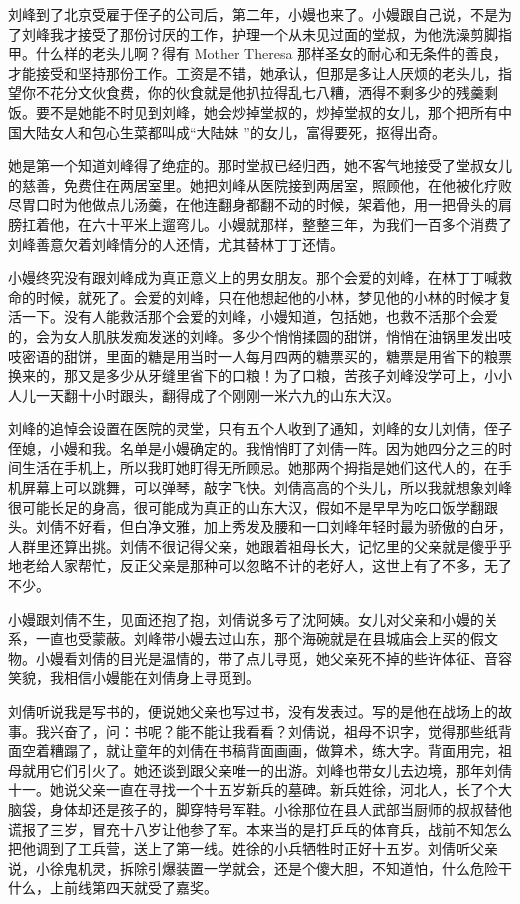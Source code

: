 \documentclass[12pt,twoside,openany]{book}
\begin{document}
刘峰到了北京受雇于侄子的公司后，第二年，小嫚也来了。小嫚跟自己说，不是为了刘峰我才接受了那份讨厌的工作，护理一个从未见过面的堂叔，为他洗澡剪脚指甲。什么样的老头儿啊？得有 Mother Theresa 那样圣女的耐心和无条件的善良，才能接受和坚持那份工作。工资是不错，她承认，但那是多让人厌烦的老头儿，指望你不花分文伙食费，你的伙食就是他扒拉得乱七八糟，洒得不剩多少的残羹剩饭。要不是她能不时见到刘峰，她会炒掉堂叔的，炒掉堂叔的女儿，那个把所有中国大陆女人和包心生菜都叫成“大陆妹 ”的女儿，富得要死，抠得出奇。

她是第一个知道刘峰得了绝症的。那时堂叔已经归西，她不客气地接受了堂叔女儿的慈善，免费住在两居室里。她把刘峰从医院接到两居室，照顾他，在他被化疗败尽胃口时为他做点儿汤羹，在他连翻身都翻不动的时候，架着他，用一把骨头的肩膀扛着他，在六十平米上遛弯儿。小嫚就那样，整整三年，为我们一百多个消费了刘峰善意欠着刘峰情分的人还情，尤其替林丁丁还情。

小嫚终究没有跟刘峰成为真正意义上的男女朋友。那个会爱的刘峰，在林丁丁喊救命的时候，就死了。会爱的刘峰，只在他想起他的小林，梦见他的小林的时候才复活一下。没有人能救活那个会爱的刘峰，小嫚知道，包括她，也救不活那个会爱的，会为女人肌肤发痴发迷的刘峰。多少个悄悄揉圆的甜饼，悄悄在油锅里发出吱吱密语的甜饼，里面的糖是用当时一人每月四两的糖票买的，糖票是用省下的粮票换来的，那又是多少从牙缝里省下的口粮！为了口粮，苦孩子刘峰没学可上，小小人儿一天翻十小时跟头，翻得成了个刚刚一米六九的山东大汉。

刘峰的追悼会设置在医院的灵堂，只有五个人收到了通知，刘峰的女儿刘倩，侄子侄媳，小嫚和我。名单是小嫚确定的。我悄悄盯了刘倩一阵。因为她四分之三的时间生活在手机上，所以我盯她盯得无所顾忌。她那两个拇指是她们这代人的，在手机屏幕上可以跳舞，可以弹琴，敲字飞快。刘倩高高的个头儿，所以我就想象刘峰很可能长足的身高，很可能成为真正的山东大汉，假如不是早早为吃口饭学翻跟头。刘倩不好看，但白净文雅，加上秀发及腰和一口刘峰年轻时最为骄傲的白牙，人群里还算出挑。刘倩不很记得父亲，她跟着祖母长大，记忆里的父亲就是傻乎乎地老给人家帮忙，反正父亲是那种可以忽略不计的老好人，这世上有了不多，无了不少。

小嫚跟刘倩不生，见面还抱了抱，刘倩说多亏了沈阿姨。女儿对父亲和小嫚的关系，一直也受蒙蔽。刘峰带小嫚去过山东，那个海碗就是在县城庙会上买的假文物。小嫚看刘倩的目光是温情的，带了点儿寻觅，她父亲死不掉的些许体征、音容笑貌，我相信小嫚能在刘倩身上寻觅到。

刘倩听说我是写书的，便说她父亲也写过书，没有发表过。写的是他在战场上的故事。我兴奋了，问：书呢？能不能让我看看？刘倩说，祖母不识字，觉得那些纸背面空着糟蹋了，就让童年的刘倩在书稿背面画画，做算术，练大字。背面用完，祖母就用它们引火了。她还谈到跟父亲唯一的出游。刘峰也带女儿去边境，那年刘倩十一。她说父亲一直在寻找一个十五岁新兵的墓碑。新兵姓徐，河北人，长了个大脑袋，身体却还是孩子的，脚穿特号军鞋。小徐那位在县人武部当厨师的叔叔替他谎报了三岁，冒充十八岁让他参了军。本来当的是打乒乓的体育兵，战前不知怎么把他调到了工兵营，送上了第一线。姓徐的小兵牺牲时正好十五岁。刘倩听父亲说，小徐鬼机灵，拆除引爆装置一学就会，还是个傻大胆，不知道怕，什么危险干什么，上前线第四天就受了嘉奖。
\end{document}
